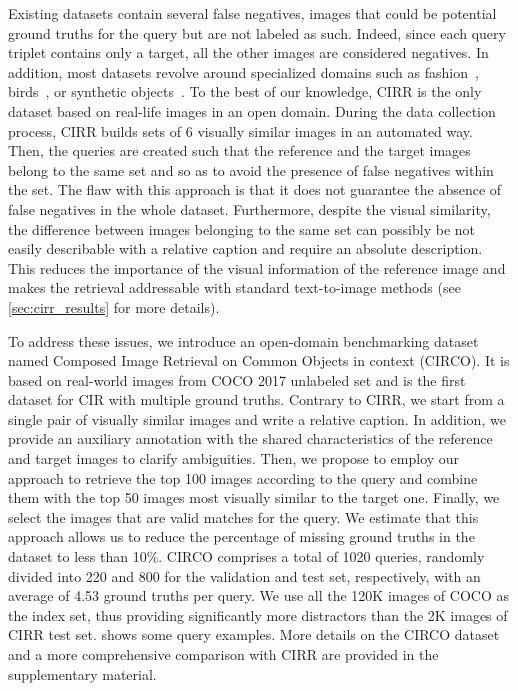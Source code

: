 \documentclass[10pt,twocolumn,letterpaper]{article}
\begin{document}
Existing datasets contain several false negatives, \ie images that could be potential ground truths for the query but are not labeled as such. Indeed, since each query triplet contains only a target, all the other images are considered negatives. In addition, most datasets revolve around specialized domains such as fashion~\cite{berg2010automatic, han2017automatic, wu2021fashion, guo2018dialog}, birds~\cite{forbes2019neural}, or synthetic objects~\cite{vo2019composing}.
To the best of our knowledge, CIRR \cite{liu2021image} is the only dataset based on real-life images in an open domain. During the data collection process, CIRR builds sets of 6 visually similar images in an automated way. Then, the queries are created such that the reference and the target images belong to the same set and so as to avoid the presence of false negatives within the set. The flaw with this approach is that it does not guarantee the absence of false negatives in the whole dataset. Furthermore, despite the visual similarity, the difference between images belonging to the same set can possibly be not easily describable with a relative caption and require an absolute description. This reduces the importance of the visual information of the reference image and makes the retrieval addressable with standard text-to-image methods (see \cref{sec:cirr_results} for more details).

To address these issues, we introduce an open-domain benchmarking dataset named Composed Image Retrieval on Common Objects in context (CIRCO). It is based on real-world images from COCO 2017 unlabeled set \cite{lin2014microsoft} and is the first dataset for CIR with multiple ground truths. Contrary to CIRR, we start from a single pair of visually similar images and write a relative caption. In addition, we provide an auxiliary annotation with the shared characteristics of the reference and target images to clarify ambiguities. Then, we propose to employ our approach to retrieve the top 100 images according to the query and combine them with the top 50 images most visually similar to the target one. Finally, we select the images that are valid matches for the query. We estimate that this approach allows us to reduce the percentage of missing ground truths in the dataset to less than 10\%. CIRCO comprises a total of 1020 queries, randomly divided into 220 and 800 for the validation and test set, respectively, with an average of 4.53 ground truths per query. We use all the 120K images of COCO as the index set, thus providing significantly more distractors than the 2K images of CIRR test set.  shows some query examples. More details on the CIRCO dataset and a more comprehensive comparison with CIRR are provided in the supplementary material.
\end{document}
